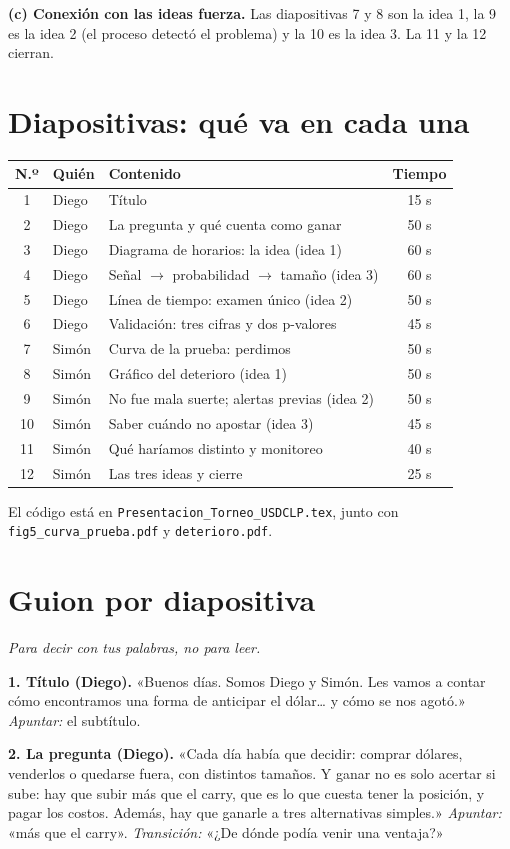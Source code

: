 \documentclass[11pt]{article}
\newcommand{\apunta}[1]{\textcolor{azul}{\emph{Apuntar:} #1}}
\begin{document}
\textbf{(c) Conexión con las ideas fuerza.} Las diapositivas 7 y 8 son la idea 1, la 9 es la idea 2 (el proceso detectó el problema) y la 10 es la idea 3. La 11 y la 12 cierran.

\section{Diapositivas: qué va en cada una}
\begin{tabularx}{\textwidth}{@{}c l X c@{}}
\toprule
N.º & Quién & Contenido & Tiempo \\ \midrule
1 & Diego & Título & 15 s \\
2 & Diego & La pregunta y qué cuenta como ganar & 50 s \\
3 & Diego & Diagrama de horarios: la idea (idea 1) & 60 s \\
4 & Diego & Señal \(\to\) probabilidad \(\to\) tamaño (idea 3) & 60 s \\
5 & Diego & Línea de tiempo: examen único (idea 2) & 50 s \\
6 & Diego & Validación: tres cifras y dos p-valores & 45 s \\
7 & Simón & Curva de la prueba: perdimos & 50 s \\
8 & Simón & Gráfico del deterioro (idea 1) & 50 s \\
9 & Simón & No fue mala suerte; alertas previas (idea 2) & 50 s \\
10 & Simón & Saber cuándo no apostar (idea 3) & 45 s \\
11 & Simón & Qué haríamos distinto y monitoreo & 40 s \\
12 & Simón & Las tres ideas y cierre & 25 s \\ \bottomrule
\end{tabularx}

El código está en \texttt{Presentacion\_Torneo\_USDCLP.tex}, junto con \texttt{fig5\_curva\_prueba.pdf} y \texttt{deterioro.pdf}.

\section{Guion por diapositiva}
\emph{Para decir con tus palabras, no para leer.}

\textbf{1. Título (Diego).} «Buenos días. Somos Diego y Simón. Les vamos a contar cómo encontramos una forma de anticipar el dólar\ldots{} y cómo se nos agotó.» \apunta{el subtítulo.}

\textbf{2. La pregunta (Diego).} «Cada día había que decidir: comprar dólares, venderlos o quedarse fuera, con distintos tamaños. Y ganar no es solo acertar si sube: hay que subir más que el carry, que es lo que cuesta tener la posición, y pagar los costos. Además, hay que ganarle a tres alternativas simples.» \apunta{«más que el carry».} \emph{Transición:} «¿De dónde podía venir una ventaja?»
\end{document}
